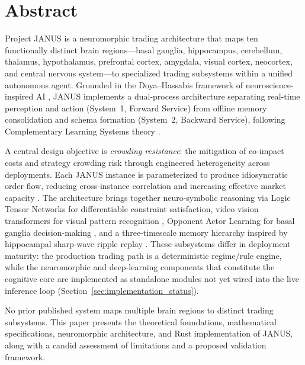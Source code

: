\documentclass[12pt, a4paper]{article}
\begin{document}
\section*{Abstract}

Project JANUS is a neuromorphic trading architecture that maps ten functionally distinct brain regions---basal ganglia, hippocampus, cerebellum, thalamus, hypothalamus, prefrontal cortex, amygdala, visual cortex, neocortex, and central nervous system---to specialized trading subsystems within a unified autonomous agent. Grounded in the Doya--Hassabis framework of neuroscience-inspired AI \citep{doya1999computations, hassabis2017neuroscience}, JANUS implements a dual-process architecture separating real-time perception and action (System~1, Forward Service) from offline memory consolidation and schema formation (System~2, Backward Service), following Complementary Learning Systems theory \citep{mcclelland1995complementary, kumaran2016cls}.

A central design objective is \textit{crowding resistance}: the mitigation of co-impact costs \citep{bucci2020coimpact} and strategy crowding risk \citep{khandani2011quants, stein2009crowding} through engineered heterogeneity across deployments. Each JANUS instance is parameterized to produce idiosyncratic order flow, reducing cross-instance correlation and increasing effective market capacity \citep{demiguel2021crowding, wagner2011diversity}. The architecture brings together neuro-symbolic reasoning via Logic Tensor Networks \citep{badreddine2022logic} for differentiable constraint satisfaction, video vision transformers for visual pattern recognition \citep{arnab2021vivit}, Opponent Actor Learning for basal ganglia decision-making \citep{collins2014opponent, jaskir2023opal}, and a three-timescale memory hierarchy inspired by hippocampal sharp-wave ripple replay \citep{wilson1994replay, masset2025multitimescale}. These subsystems differ in deployment maturity: the production trading path is a deterministic regime/rule engine, while the neuromorphic and deep-learning components that constitute the cognitive core are implemented as standalone modules not yet wired into the live inference loop (Section~\ref{sec:implementation_status}).

No prior published system maps multiple brain regions to distinct trading subsystems. This paper presents the theoretical foundations, mathematical specifications, neuromorphic architecture, and Rust implementation of JANUS, along with a candid assessment of limitations and a proposed validation framework.
\end{document}
